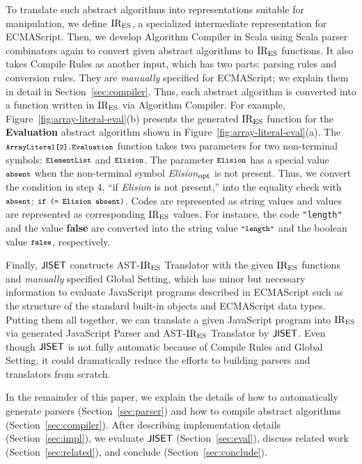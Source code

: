 To translate such abstract algorithms into representations
suitable for manipulation, we define \( \text{IR}_\text{ES} \), a specialized
intermediate representation for ECMAScript.  Then,
we develop \textsf{Algorithm Compiler} in Scala using Scala parser
combinators again to convert given abstract algorithms to \( \text{IR}_\text{ES} \)
functions.  It also takes \textsf{Compile Rules} as another input,
which has two parts: parsing rules and conversion rules.  They are
\textit{manually} specified for ECMAScript; we explain them in
detail in Section~\ref{sec:compiler}.  Thus, each abstract algorithm is
converted into a function written in \( \text{IR}_\text{ES} \) via \textsf{Algorithm Compiler}.
For example, Figure~\ref{fig:array-literal-eval}(b) presents the generated
\( \text{IR}_\text{ES} \) function for the \textbf{Evaluation} abstract algorithm shown in
Figure~\ref{fig:array-literal-eval}(a).
The \( \texttt{\footnotesize ArrayLiteral[2].Evaluation} \) function takes two parameters for
two non-terminal symbols: \( \texttt{\footnotesize ElementList} \) and \( \texttt{\footnotesize Elision} \).
The parameter \( \texttt{\footnotesize Elision} \) has a special value \( \texttt{\footnotesize absent} \) when
the non-terminal symbol \textit{Elision}$_{\mbox{\footnotesize opt}}$ is not
present.  Thus, we convert the condition in step 4,
``if \textit{Elision} is not present,'' into the equality check with \(
\texttt{\footnotesize absent} \): \( \texttt{\footnotesize if (= Elision absent)} \).  Codes are represented as
string values and values are represented as corresponding \( \text{IR}_\text{ES} \) values.
For instance, the code \texttt{\small "length"} and the value \textbf{false} are
converted into the string value \( \texttt{\footnotesize"length"} \) and the boolean value
\( \texttt{\footnotesize false} \), respectively.

Finally, \( \text{\sf JISET} \) constructs {\sf AST-\( \text{IR}_\text{ES} \) Translator} with the given
\( \text{IR}_\text{ES} \) functions and \textit{manually} specified {\sf Global Setting},
which has minor but necessary information to evaluate JavaScript programs
described in ECMAScript such as the structure of the standard
built-in objects and ECMAScript data types. Putting them all together, we can
translate a given JavaScript program into \( \text{IR}_\text{ES} \) via generated {\sf
JavaScript Parser} and {\sf AST-\( \text{IR}_\text{ES} \) Translator} by \( \text{\sf JISET} \).  Even
though \( \text{\sf JISET} \) is not fully automatic because of {\sf Compile Rules} and
{\sf Global Setting}, it could dramatically reduce the efforts to building
parsers and translators from scratch.

In the remainder of this paper, we explain the details of how to
automatically generate parsers (Section~\ref{sec:parser}) and how to compile
abstract algorithms (Section~\ref{sec:compiler}).  After describing implementation
details (Section~\ref{sec:impl}), we evaluate \( \text{\sf JISET} \)
(Section~\ref{sec:eval}), discuss related work (Section~\ref{sec:related}), and
conclude (Section~\ref{sec:conclude}).
